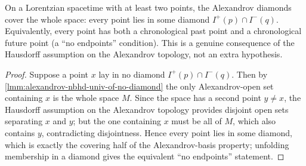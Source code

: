 \medskip

\begin{lemma}
    \label{lmm:alexandrov-covering-hausdorff}
    \leanok
    On a Lorentzian spacetime with at least two points, the Alexandrov diamonds cover the whole space: every point lies in some diamond $I^+(p) \cap I^-(q)$. Equivalently, every point has both a chronological past point and a chronological future point (a ``no endpoints'' condition). This is a genuine consequence of the Hausdorff assumption on the Alexandrov topology, not an extra hypothesis.
\end{lemma}
\begin{proof}
    \leanok
    Suppose a point $x$ lay in no diamond $I^+(p) \cap I^-(q)$. Then by \ref{lmm:alexandrov-nbhd-univ-of-no-diamond} the only Alexandrov-open set containing $x$ is the whole space $M$. Since the space has a second point $y \ne x$, the Hausdorff assumption on the Alexandrov topology provides disjoint open sets separating $x$ and $y$; but the one containing $x$ must be all of $M$, which also contains $y$, contradicting disjointness. Hence every point lies in some diamond, which is exactly the covering half of the Alexandrov-basis property; unfolding membership in a diamond gives the equivalent ``no endpoints'' statement.
\end{proof}

\medskip

